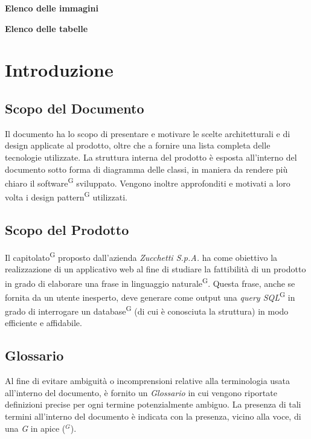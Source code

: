\documentclass[5pt]{article}
\begin{document}
	\pagebreak
	\tableofcontents
	\pagebreak
	\textbf{\Large Elenco delle immagini} \\
	\makeatletter
	\makeatother
	
	\pagebreak
	\textbf{\Large Elenco delle tabelle} \\
	\makeatletter
	\makeatother
	\pagebreak
	
	\section{Introduzione}
	
	\subsection{Scopo del Documento}

    Il documento ha lo scopo di presentare e motivare le scelte architetturali e di design applicate al prodotto, oltre che a fornire una lista completa delle tecnologie utilizzate. La struttura interna del prodotto è esposta all'interno del documento sotto forma di diagramma delle classi, in maniera da rendere più chiaro il software\textsuperscript{G} sviluppato. Vengono inoltre approfonditi e motivati a loro volta i design pattern\textsuperscript{G} utilizzati. 
	
	\subsection{Scopo del Prodotto}
    Il capitolato\textsuperscript{G} proposto dall'azienda \textit{Zucchetti S.p.A.} ha come obiettivo la realizzazione di un applicativo web al fine di studiare la fattibilità di un prodotto in grado di elaborare una frase in linguaggio naturale\textsuperscript{G}. Questa frase, anche se fornita da un utente inesperto, deve generare come output una \textit{query SQL}\textsuperscript{G} in grado di interrogare un database\textsuperscript{G} (di cui è conosciuta la struttura) in modo efficiente e affidabile.
	
	\subsection{Glossario}
    Al fine di evitare ambiguità o incomprensioni relative alla terminologia usata all'interno del documento, è fornito un \textit{Glossario} in cui vengono riportate definizioni precise per ogni termine potenzialmente ambiguo. La presenza di tali termini all'interno del documento è indicata con la presenza, vicino alla voce, di una \textit{G} in apice ($^G$). 
\end{document}
